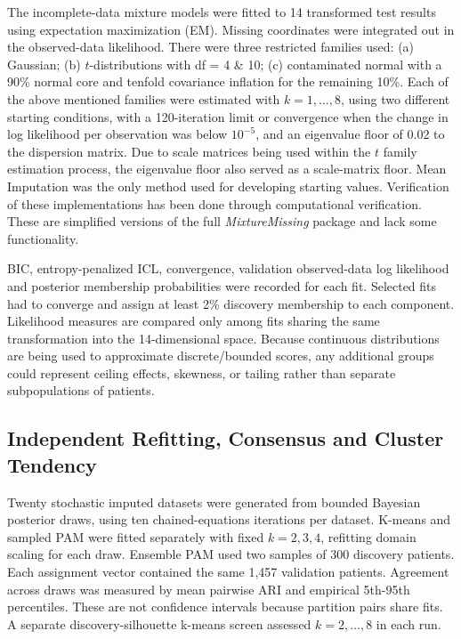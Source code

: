 The incomplete-data mixture models were fitted to 14 transformed test results using expectation maximization (EM). Missing coordinates were integrated out in the observed-data likelihood. There were three restricted families used: (a) Gaussian; (b) $t$-distributions with df = 4 \& 10; (c) contaminated normal with a 90\% normal core and tenfold covariance inflation for the remaining 10\%. Each of the above mentioned families were estimated with $k=1,\ldots,8$, using two different starting conditions, with a 120-iteration limit or convergence when the change in log likelihood per observation was below $10^{-5}$, and an eigenvalue floor of 0.02 to the dispersion matrix. Due to scale matrices being used within the $t$ family estimation process, the eigenvalue floor also served as a scale-matrix floor. Mean Imputation was the only method used for developing starting values. Verification of these implementations has been done through computational verification. These are simplified versions of the full \textit{MixtureMissing} package \parencite{tong2025mixturemissing} and lack some functionality.

BIC, entropy-penalized ICL, convergence, validation observed-data log likelihood and posterior membership probabilities were recorded for each fit. Selected fits had to converge and assign at least 2\% discovery membership to each component. Likelihood measures are compared only among fits sharing the same transformation into the 14-dimensional space. Because continuous distributions are being used to approximate discrete/bounded scores, any additional groups could represent ceiling effects, skewness, or tailing rather than separate subpopulations of patients.

\subsection{Independent Refitting, Consensus and Cluster Tendency}

Twenty stochastic imputed datasets were generated from bounded Bayesian posterior draws, using ten chained-equations iterations per dataset. K-means and sampled PAM were fitted separately with fixed $k=2,3,4$, refitting domain scaling for each draw. Ensemble PAM used two samples of 300 discovery patients. Each assignment vector contained the same 1,457 validation patients. Agreement across draws was measured by mean pairwise ARI and empirical 5th-95th percentiles. These are not confidence intervals because partition pairs share fits. A separate discovery-silhouette k-means screen assessed $k=2,\ldots,8$ in each run.

